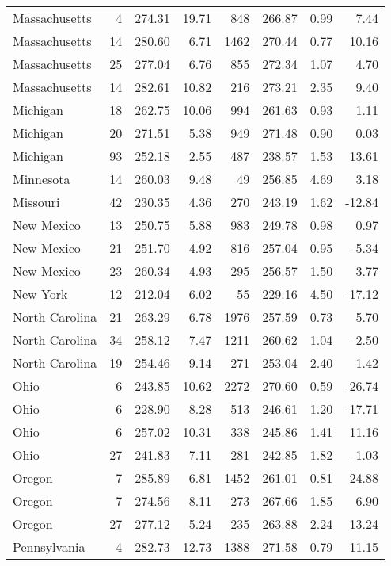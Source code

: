 \begin{longtable}{lrrr@{\extracolsep{10pt}}rrrr}
  Massachusetts &   4 & 274.31 & 19.71 & 848 & 266.87 & 0.99 & 7.44 \\ 
  Massachusetts &  14 & 280.60 & 6.71 & 1462 & 270.44 & 0.77 & 10.16 \\ 
  Massachusetts &  25 & 277.04 & 6.76 & 855 & 272.34 & 1.07 & 4.70 \\ 
  Massachusetts &  14 & 282.61 & 10.82 & 216 & 273.21 & 2.35 & 9.40 \\ 
  Michigan &  18 & 262.75 & 10.06 & 994 & 261.63 & 0.93 & 1.11 \\ 
  Michigan &  20 & 271.51 & 5.38 & 949 & 271.48 & 0.90 & 0.03 \\ 
  Michigan &  93 & 252.18 & 2.55 & 487 & 238.57 & 1.53 & 13.61 \\ 
  Minnesota &  14 & 260.03 & 9.48 &  49 & 256.85 & 4.69 & 3.18 \\ 
  Missouri &  42 & 230.35 & 4.36 & 270 & 243.19 & 1.62 & -12.84 \\ 
  New Mexico &  13 & 250.75 & 5.88 & 983 & 249.78 & 0.98 & 0.97 \\ 
  New Mexico &  21 & 251.70 & 4.92 & 816 & 257.04 & 0.95 & -5.34 \\ 
  New Mexico &  23 & 260.34 & 4.93 & 295 & 256.57 & 1.50 & 3.77 \\ 
  New York &  12 & 212.04 & 6.02 &  55 & 229.16 & 4.50 & -17.12 \\ 
  North Carolina &  21 & 263.29 & 6.78 & 1976 & 257.59 & 0.73 & 5.70 \\ 
  North Carolina &  34 & 258.12 & 7.47 & 1211 & 260.62 & 1.04 & -2.50 \\ 
  North Carolina &  19 & 254.46 & 9.14 & 271 & 253.04 & 2.40 & 1.42 \\ 
  Ohio &   6 & 243.85 & 10.62 & 2272 & 270.60 & 0.59 & -26.74 \\ 
  Ohio &   6 & 228.90 & 8.28 & 513 & 246.61 & 1.20 & -17.71 \\ 
  Ohio &   6 & 257.02 & 10.31 & 338 & 245.86 & 1.41 & 11.16 \\ 
  Ohio &  27 & 241.83 & 7.11 & 281 & 242.85 & 1.82 & -1.03 \\ 
  Oregon &   7 & 285.89 & 6.81 & 1452 & 261.01 & 0.81 & 24.88 \\ 
  Oregon &   7 & 274.56 & 8.11 & 273 & 267.66 & 1.85 & 6.90 \\ 
  Oregon &  27 & 277.12 & 5.24 & 235 & 263.88 & 2.24 & 13.24 \\ 
  Pennsylvania &   4 & 282.73 & 12.73 & 1388 & 271.58 & 0.79 & 11.15 \\ 

\end{longtable}
